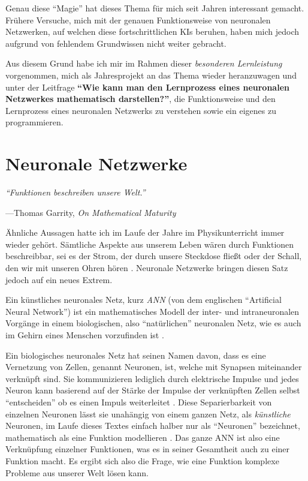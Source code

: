 \documentclass[12pt,titlepage]{article}
\begin{document}
Genau diese \enquote{Magie} hat dieses Thema für mich seit Jahren interessant gemacht. Frühere Versuche, mich mit der genauen Funktionsweise von neuronalen Netzwerken, auf welchen diese fortschrittlichen KIs beruhen, haben mich jedoch aufgrund von fehlendem Grundwissen nicht weiter gebracht.

Aus diesem Grund habe ich mir im Rahmen dieser \textit{besonderen Lernleistung} vorgenommen, mich als Jahresprojekt an das Thema wieder heranzuwagen und unter der Leitfrage \textbf{\enquote{Wie kann man den Lernprozess eines neuronalen Netzwerkes mathematisch darstellen?}}, die Funktionsweise und den Lernprozess eines neuronalen Netzwerks zu verstehen sowie ein eigenes zu programmieren.

\section{Neuronale Netzwerke}

\epigraph{\itshape \enquote{Funktionen beschreiben unsere Welt.}}{---Thomas Garrity, \textit{On Mathematical Maturity}}

Ähnliche Aussagen hatte ich im Laufe der Jahre im Physikunterricht immer wieder gehört. Sämtliche Aspekte aus unserem Leben wären durch Funktionen beschreibbar, sei es der Strom, der durch unsere Steckdose fließt oder der Schall, den wir mit unseren Ohren hören \autocite{garrityMathematicalMaturity2017}. Neuronale Netzwerke bringen diesen Satz jedoch auf ein neues Extrem.

Ein künstliches neuronales Netz, kurz \textit{ANN} (von dem englischen \enquote{Artificial Neural Network}) ist ein mathematisches Modell der inter- und intraneuronalen Vorgänge in einem biologischen, also \enquote{natürlichen} neuronalen Netz, wie es auch im Gehirn eines Menschen vorzufinden ist \autocite[3]{suzukiArtificialNeuralNetworks2011}.

Ein biologisches neuronales Netz hat seinen Namen davon, dass es eine Vernetzung von Zellen, genannt Neuronen, ist, welche mit Synapsen miteinander verknüpft sind. Sie kommunizieren lediglich durch elektrische Impulse und jedes Neuron kann basierend auf der Stärke der Impulse der verknüpften Zellen selbst \enquote{entscheiden} ob es einen Impuls weiterleitet \autocite[1]{mccullochLogicalCalculusIdeas1943}. Diese Separierbarkeit von einzelnen Neuronen lässt sie unahängig von einem ganzen Netz, als \textit{künstliche} Neuronen, im Laufe dieses Textes einfach halber nur als \enquote{Neuronen} bezeichnet, mathematisch als eine Funktion modellieren \autocite[3]{suzukiArtificialNeuralNetworks2011}. Das ganze ANN ist also eine Verknüpfung einzelner Funktionen, was es in seiner Gesamtheit auch zu einer Funktion macht. Es ergibt sich also die Frage, wie eine Funktion komplexe Probleme aus unserer Welt lösen kann.
\end{document}

